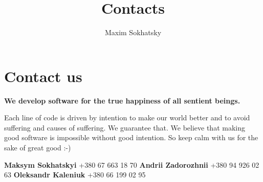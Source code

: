 \documentclass[11pt]{article}
\begin{document}

\title{Contacts}
\author{Maxim Sokhatsky}


\section*{Contact us}

\textbf{We develop software for the true happiness of all sentient beings.}

Each line of code is driven by intention to make our world better and to
avoid suffering and causes of suffering. We guarantee that.
We believe that making good software is impossible without good intention.
So keep calm with us for the sake of great good :-)


\textbf{Maksym Sokhatskyi}  +380 67 663 18 70 \@br
\textbf{Andrii Zadorozhnii}  +380 94 926 02 63 \@br
\textbf{Oleksandr Kaleniuk}  +380 66 199 02 95 \@br

\end{document}
